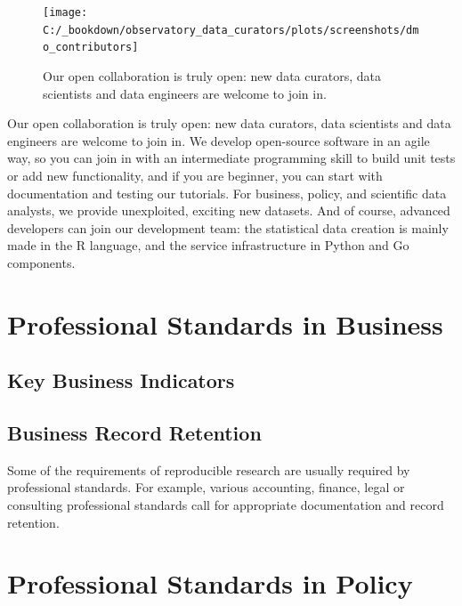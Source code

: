 \documentclass[
  a4paper,
  openany, a4paper, oneside]{book}
\begin{document}
\begin{figure}

{\centering \texttt{[image: C:/\_bookdown/observatory\_data\_curators/plots/screenshots/dmo\_contributors]} 

}

\caption{Our open collaboration is truly open: new data curators, data scientists and data engineers are welcome to join in.}\label{fig:unnamed-chunk-2}
\end{figure}

Our open collaboration is truly open: new data curators, data scientists and data engineers are welcome to join in. We develop open-source software in an agile way, so you can join in with an intermediate programming skill to build unit tests or add new functionality, and if you are beginner, you can start with documentation and testing our tutorials. For business, policy, and scientific data analysts, we provide unexploited, exciting new datasets. And of course, advanced developers can join our development team: the statistical data creation is mainly made in the R language, and the service infrastructure in Python and Go components.

\hypertarget{business-professional-standards}{%
\section{Professional Standards in Business}\label{business-professional-standards}}

\hypertarget{key-business-indicators}{%
\subsection{Key Business Indicators}\label{key-business-indicators}}

\hypertarget{business-record-retention}{%
\subsection{Business Record Retention}\label{business-record-retention}}

Some of the requirements of reproducible research are usually required by professional standards. For example, various accounting, finance, legal or consulting professional standards call for appropriate documentation and record retention.

\hypertarget{policy-professional-standards}{%
\section{Professional Standards in Policy}\label{policy-professional-standards}}
\end{document}
